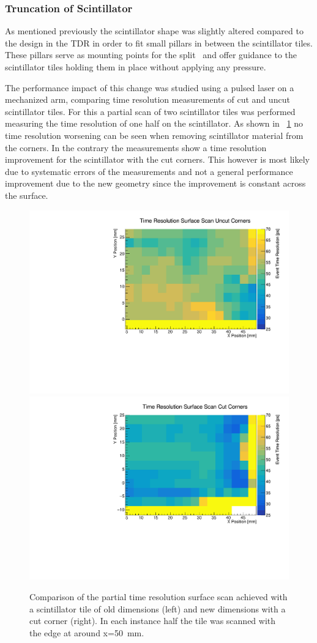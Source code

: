 \documentclass[../BTOF_summary.tex]{subfiles}
\begin{document}
\subsubsection*{Truncation of Scintillator}
    
As mentioned previously the scintillator shape was slightly altered compared to the design in the TDR in order to fit small pillars in between the scintillator tiles.
These pillars serve as mounting points for the split \railboard\ and offer guidance to the scintillator tiles holding them in place without applying any pressure.

The performance impact of this change was studied using a pulsed laser on a mechanized arm, comparing time resolution measurements of cut and uncut scintillator tiles.
For this a partial scan of two scintillator tiles was performed measuring the time resolution of one half on the scintillator.
As shown in \fig~\ref{fig:Surface_Scan_cutUncut} no time resolution worsening can be seen when removing scintillator material from the corners.
In the contrary the measurements show a time resolution improvement for the scintillator with the cut corners.
This however is most likely due to systematic errors of the measurements and not a general performance improvement due to the new geometry since the improvement is constant across the surface.

\begin{figure}[htpb]
	\centering
	\includegraphics[width=.49\textwidth]{fig/Time_Resolution_Surface_Scan_Uncut_Corners.pdf}
	\includegraphics[width=.49\textwidth]{fig/Time_Resolution_Surface_Scan_Cut_Corners.pdf}
	\caption{Comparison of the partial time resolution surface scan achieved with a scintillator tile of old dimensions (left) and new dimensions with a cut corner (right). In each instance half the tile was scanned with the edge at around x=\SI{50}{mm}.}
	\label{fig:Surface_Scan_cutUncut}
\end{figure}
\end{document}
